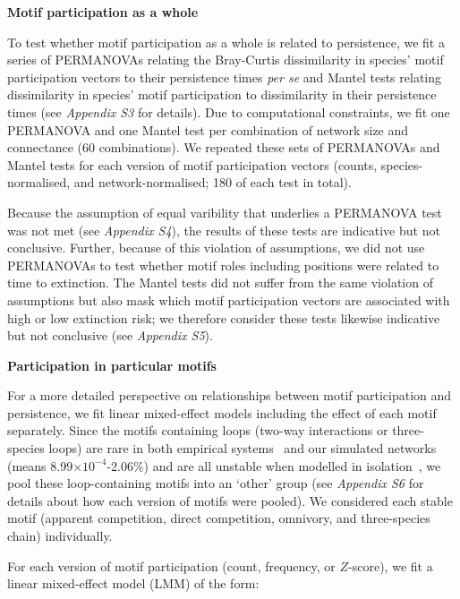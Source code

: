 \documentclass[12pt]{article}
\begin{document}
\begin{spacing}{2.0}
            \textbf{Motif participation as a whole}

                To test whether motif participation as a whole is related to persistence, we fit a series of PERMANOVAs relating the Bray-Curtis dissimilarity in species' motif participation vectors to their persistence times \emph{per se} and Mantel tests relating dissimilarity in species' motif participation to dissimilarity in their persistence times (see \emph{Appendix S3} for details). 
                Due to computational constraints, we fit one PERMANOVA and one Mantel test per combination of network size and connectance (60 combinations). 
                We repeated these sets of PERMANOVAs and Mantel tests for each version of motif participation vectors (counts, species-normalised, and network-normalised; 180 of each test in total).
                
                
                Because the assumption of equal varibility that underlies a PERMANOVA test was not met (see \emph{Appendix S4}), the results of these tests are indicative but not conclusive.
                Further, because of this violation of assumptions, we did not use PERMANOVAs to test whether motif roles including positions were related to time to extinction.
                The Mantel tests did not suffer from the same violation of assumptions but also mask which motif participation vectors are associated with high or low extinction risk; we therefore consider these tests likewise indicative but not conclusive (see \emph{Appendix S5}).


            \textbf{Participation in particular motifs}

                For a more detailed perspective on relationships between motif participation and persistence, we fit linear mixed-effect models including the effect of each motif separately.
                Since the motifs containing loops (two-way interactions or three-species loops) are rare in both empirical systems~\citep{Stouffer2007} and our simulated networks (means 8.99$\times10^{-4}$-2.06\%) and are all unstable when modelled in isolation~\citep{Borrelli2015a}, we pool these loop-containing motifs into an `other' group (see \emph{Appendix S6} for details about how each version of motifs were pooled). 
                We considered each stable motif (apparent competition, direct competition, omnivory, and three-species chain) individually.


                For each version of motif participation (count, frequency, or $Z$-score), we fit a  linear mixed-effect model (LMM) of the form:


\end{spacing}
\end{document}
